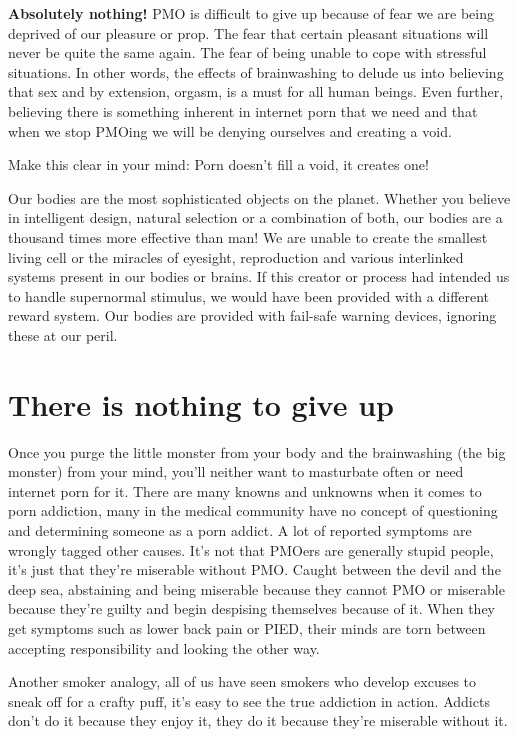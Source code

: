\documentclass[easypeasy.tex]{subfiles}
\begin{document}
\textbf{Absolutely nothing!} PMO is difficult to give up because of fear we are being deprived of our pleasure or prop. The fear that certain pleasant situations will never be quite the same again. The fear of being unable to cope with stressful situations. In other words, the effects of brainwashing to delude us into believing that sex and by extension, orgasm, is a must for all human beings. Even further, believing there is something inherent in internet porn that we need and that when we stop PMOing we will be denying ourselves and creating a void.

Make this clear in your mind:
  {\Large Porn doesn't fill a void, it creates one!}

Our bodies are the most sophisticated objects on the planet. Whether you believe in intelligent design, natural selection or a combination of both, our bodies are a thousand times more effective than man! We are unable to create the smallest living cell or the miracles of eyesight, reproduction and various interlinked systems present in our bodies or brains. If this creator or process had intended us to handle supernormal stimulus, we would have been provided with a different reward system. Our bodies are provided with fail-safe warning devices, ignoring these at our peril.

\section{There is nothing to give up}
Once you purge the little monster from your body and the brainwashing (the big monster) from your mind, you'll neither want to masturbate often or need internet porn for it. There are many knowns and unknowns when it comes to porn addiction, many in the medical community have no concept of questioning and determining someone as a porn addict. A lot of reported symptoms are wrongly tagged other causes. It's not that PMOers are generally stupid people, it's just that they're miserable without PMO. Caught between the devil and the deep sea, abstaining and being miserable because they cannot PMO or miserable because they're guilty and begin despising themselves because of it. When they get symptoms such as lower back pain or PIED, their minds are torn between accepting responsibility and looking the other way.

Another smoker analogy, all of us have seen smokers who develop excuses to sneak off for a crafty puff, it's easy to see the true addiction in action. Addicts don't do it because they enjoy it, they do it because they're miserable without it.
\end{document}
